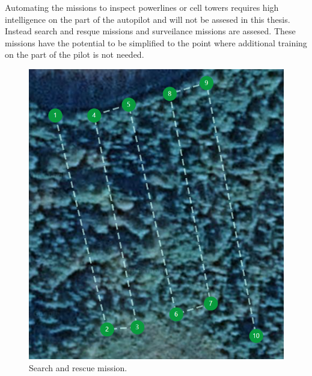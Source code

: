 \documentclass[12pt,oneside]{reedthesis}
\theoremstyle{definition}
\theoremstyle{definition}
\theoremstyle{definition}
\theoremstyle{remark}
\begin{document}
Automating the missions to inspect powerlines or cell towers requires
high intelligence on the part of the autopilot and will not be assesed
in this thesis. Instead search and resque missions and surveilance
missions are assesed. These missions have the potential to be simplified
to the point where additional training on the part of the pilot is not
needed.
\begin{figure}
\centering
\includegraphics{./figure/scanningMission.PNG}
\caption[\label{fig:scanning}Search and rescue
mission.]{\label{fig:scanning}Search and rescue mission.\footnotemark{}}
\end{figure}
\end{document}

